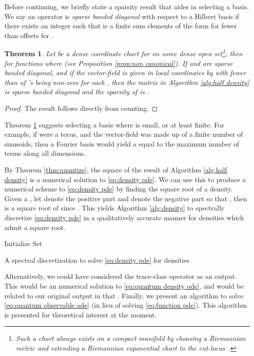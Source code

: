 \documentclass[final,leqno]{amsart}
\newtheorem{theorem}{Theorem}[section]
\begin{document}
Before continuing, we briefly state a sparsity result that aides in selecting a basis.
We say an operator  is \emph{sparse banded diagonal} with respect to a Hilbert basis  if there exists an integer 
such that  is a finite sum elements of the form  for fewer than  offsets  for .
\begin{theorem} \label{thm:sparsity}
	Let  be a dense coordinate chart for  on some dense open set\footnote{Such a chart always exists on a compact manifold by choosing a Riemannian metric and extending a Riemannian exponential chart to the cut-locus~\cite{Sakai1996,MO_dense_charts}. },
	then  for functions  where  (see Proposition \ref{prop:non canonical}).
	If  and  are sparse banded diagonal, 
	and if the vector-field  is given in local coordinates by  with fewer than  of 's being non-zero for each , then the matrix  in Algorithm \ref{alg:half density} is sparse banded diagonal and the sparsity of  is .
\end{theorem}
\begin{proof}
The result follows directly from counting.
\end{proof}

Theorem \ref{thm:sparsity} suggests selecting a basis where  is small, or at least finite.
For example, if  were a torus, and the vector-field was made up of a finite number of sinusoids, then a Fourier basis would yield a  equal to the maximum number of terms along all dimensions.

By Theorem \ref{thm:quantize}, the square of the result of Algorithm \ref{alg:half density} is a numerical solution to \eqref{eq:density pde}.
We can use this to produce a numerical scheme to \eqref{eq:density pde} by finding the square root of a density.
Given a , let  denote the positive part and  denote the negative part so that , 
then  is a square root of  since .
This yields Algorithm \ref{alg:density} to spectrally discretize \eqref{eq:density pde} in a qualitatively accurate manner for densities which admit a square root.

\begin{algorithm}[H] 
Initialize \;
	Set \;
	\caption{A spectral discretization to solve \eqref{eq:density pde} for densities} \label{alg:density}
\end{algorithm}

Alternatively, we could have considered the trace-class operator  as an output. 
This would be an numerical solution to \eqref{eq:quantum density ode}, and would be related to our original output in that .
Finally, we present an algorithm to solve \eqref{eq:quantum observable ode} (in lieu of solving \eqref{eq:function pde}).
This algorithm is presented for theoretical interest at the moment.
\end{document}
